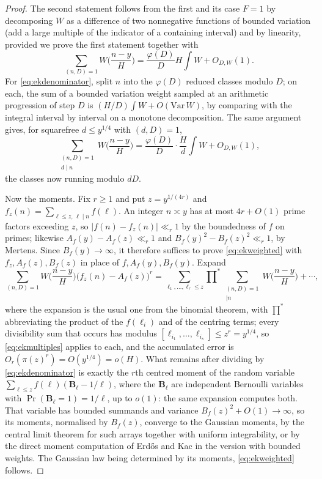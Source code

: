 \documentclass[11pt,reqno]{amsart}
\theoremstyle{plain}
\theoremstyle{definition}
\begin{document}
\begin{proof}
The second statement follows from the first and its case $F=1$ by decomposing $W$ as a difference of two nonnegative functions of bounded variation (add a large multiple of the indicator of a containing interval) and by linearity, provided we prove the first statement together with
\begin{equation}\label{eq:ekdenominator}
\sum_{(n,D)=1}W\Big(\frac{n-y}H\Big)=\frac{\varphi(D)}DH\int W+O_{D,W}(1).
\end{equation}
For \eqref{eq:ekdenominator}, split $n$ into the $\varphi(D)$ reduced classes modulo $D$; on each, the sum of a bounded variation weight sampled at an arithmetic progression of step $D$ is $(H/D)\int W+O(\mathrm{Var}\,W)$, by comparing with the integral interval by interval on a monotone decomposition. The same argument gives, for squarefree $d\le y^{1/4}$ with $(d,D)=1$,
\begin{equation}\label{eq:ekmultiples}
\sum_{\substack{(n,D)=1\\ d\mid n}}W\Big(\frac{n-y}H\Big)=\frac{\varphi(D)}D\cdot\frac Hd\int W+O_{D,W}(1),
\end{equation}
the classes now running modulo $dD$.

Now the moments. Fix $r\ge1$ and put $z=y^{1/(4r)}$ and $f_z(n)=\sum_{\ell\le z,\,\ell\mid n}f(\ell)$. An integer $n\asymp y$ has at most $4r+O(1)$ prime factors exceeding $z$, so $|f(n)-f_z(n)|\ll_r1$ by the boundedness of $f$ on primes; likewise $A_f(y)-A_f(z)\ll_r1$ and $B_f(y)^{2}-B_f(z)^{2}\ll_r1$, by Mertens. Since $B_f(y)\to\infty$, it therefore suffices to prove \eqref{eq:ekweighted} with $f_z,A_f(z),B_f(z)$ in place of $f,A_f(y),B_f(y)$. Expand
\[
\sum_{(n,D)=1}W\Big(\frac{n-y}H\Big)\Big(f_z(n)-A_f(z)\Big)^{r}
=\sum_{\ell_1,\dots,\ell_r\le z}\prod\nolimits^{*}
\sum_{\substack{(n,D)=1\\ [\ell_1,\dots,\ell_r]\mid n}}W\Big(\frac{n-y}H\Big)+\cdots,
\]
where the expansion is the usual one from the binomial theorem, with $\prod^*$ abbreviating the product of the $f(\ell_i)$ and of the centring terms; every divisibility sum that occurs has modulus $[\ell_{i_1},\dots,\ell_{i_s}]\le z^{r}=y^{1/4}$, so \eqref{eq:ekmultiples} applies to each, and the accumulated error is $O_{r}(\pi(z)^{r})=O(y^{1/4})=o(H)$. What remains after dividing by \eqref{eq:ekdenominator} is exactly the $r$th centred moment of the random variable $\sum_{\ell\le z}f(\ell)(\mathbf B_\ell-1/\ell)$, where the $\mathbf B_\ell$ are independent Bernoulli variables with $\Pr(\mathbf B_\ell=1)=1/\ell$, up to $o(1)$: the same expansion computes both. That variable has bounded summands and variance $B_f(z)^{2}+O(1)\to\infty$, so its moments, normalised by $B_f(z)$, converge to the Gaussian moments, by the central limit theorem for such arrays together with uniform integrability, or by the direct moment computation of Erd\H{o}s and Kac in the version with bounded weights. The Gaussian law being determined by its moments, \eqref{eq:ekweighted} follows.
\end{proof}
\end{document}

